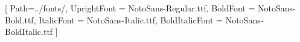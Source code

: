 \renewcommand{\headrulewidth}{0pt}
\renewcommand{\footrulewidth}{0pt}



\fancyfoot[R]{%
    \raisebox{-15mm}{\hspace{5mm} \thepage}  %
}

\renewcommand{\footrulewidth}{0pt}  %



\setmainfont{Noto Sans}[
    Path=../fonts/, %
    UprightFont = NotoSans-Regular.ttf,
    BoldFont = NotoSans-Bold.ttf,
    ItalicFont = NotoSans-Italic.ttf,
    BoldItalicFont = NotoSans-BoldItalic.ttf
]


\newcommand{\TitleFont}{\NotoSansBold\fontsize{13pt}{15pt}\selectfont}
\newcommand{\SubtitleFont}{\NotoSansBold\fontsize{11pt}{13pt}\selectfont}
\newcommand{\HeaderOne}{\NotoSansBold\fontsize{11pt}{13pt}\selectfont}
\newcommand{\HeaderTwo}{\NotoSansBold\fontsize{10pt}{12pt}\selectfont}
\newcommand{\HeaderThree}{\NotoSansBold\fontsize{10pt}{12pt}\selectfont}
\newcommand{\BodyFont}{\fontsize{10pt}{12pt}\selectfont}

\renewcommand{\normalsize}{\BodyFont}


\renewcommand{\cftfigpresnum}{Figura~} %
\renewcommand{\cfttabpresnum}{Tabla~} %
\setlength{\cftfignumwidth}{5em}
\setlength{\cfttabnumwidth}{5em}



\let\origsection\section
\renewcommand{\section}{\FloatBarrier\origsection}  %

